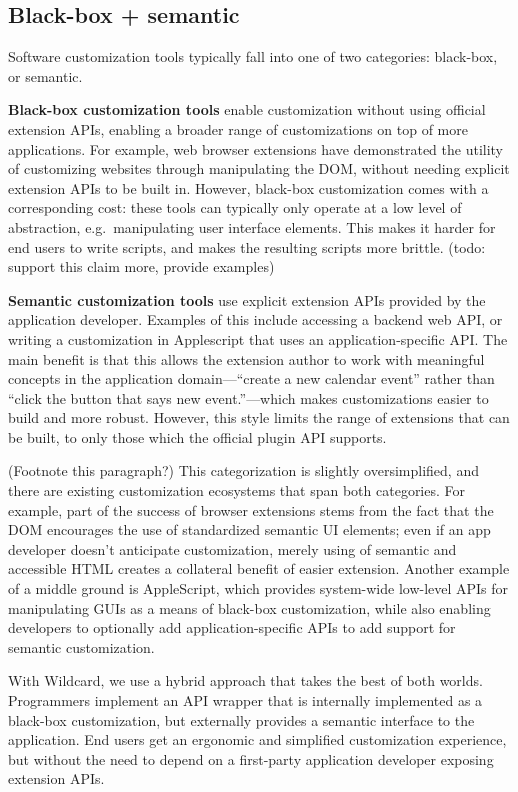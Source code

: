 \documentclass[sigplan,10pt,anonymous,review]{acmart}
\begin{document}
\hypertarget{black-box-semantic}{%
\subsection{Black-box + semantic}\label{black-box-semantic}}

Software customization tools typically fall into one of two categories:
black-box, or semantic.

\textbf{Black-box customization tools} enable customization without
using official extension APIs, enabling a broader range of
customizations on top of more applications. For example, web browser
extensions have demonstrated the utility of customizing websites through
manipulating the DOM, without needing explicit extension APIs to be
built in. However, black-box customization comes with a corresponding
cost: these tools can typically only operate at a low level of
abstraction, e.g.~manipulating user interface elements. This makes it
harder for end users to write scripts, and makes the resulting scripts
more brittle. (todo: support this claim more, provide examples)

\textbf{Semantic customization tools} use explicit extension APIs
provided by the application developer. Examples of this include
accessing a backend web API, or writing a customization in Applescript
that uses an application-specific API. The main benefit is that this
allows the extension author to work with meaningful concepts in the
application domain---``create a new calendar event'' rather than ``click
the button that says new event.''---which makes customizations easier to
build and more robust. However, this style limits the range of
extensions that can be built, to only those which the official plugin
API supports.

(Footnote this paragraph?) This categorization is slightly
oversimplified, and there are existing customization ecosystems that
span both categories. For example, part of the success of browser
extensions stems from the fact that the DOM encourages the use of
standardized semantic UI elements; even if an app developer doesn't
anticipate customization, merely using of semantic and accessible HTML
creates a collateral benefit of easier extension. Another example of a
middle ground is AppleScript, which provides system-wide low-level APIs
for manipulating GUIs as a means of black-box customization, while also
enabling developers to optionally add application-specific APIs to add
support for semantic customization.

With Wildcard, we use a hybrid approach that takes the best of both
worlds. Programmers implement an API wrapper that is internally
implemented as a black-box customization, but externally provides a
semantic interface to the application. End users get an ergonomic and
simplified customization experience, but without the need to depend on a
first-party application developer exposing extension APIs.
\end{document}
